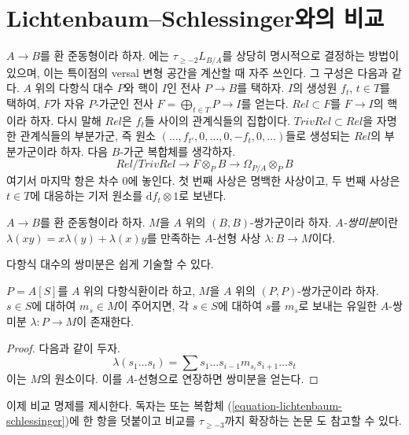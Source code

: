 \section{Lichtenbaum--Schlessinger와의 비교}
\label{section-compare-higher}

\noindent
$A \to B$를 환 준동형이라 하자. \cite{Lichtenbaum-Schlessinger}에는
$\tau_{\geq -2}L_{B/A}$를 상당히 명시적으로 결정하는 방법이 있으며,
이는 특이점의 versal 변형 공간을 계산할 때 자주 쓰인다. 그 구성은 다음과
같다. $A$ 위의 다항식 대수 $P$와 핵이 $I$인 전사 $P \to B$를 택하자.
$I$의 생성원 $f_t$, $t \in T$를 택하여, $F$가 자유 $P$-가군인 전사
$F = \bigoplus_{t \in T} P \to I$를 얻는다. $Rel \subset F$를
$F \to I$의 핵이라 하자. 다시 말해 $Rel$은 $f_t$들 사이의 관계식들의
집합이다. $TrivRel \subset Rel$을 자명한 관계식들의 부분가군, 즉 원소
$(\ldots, f_{t'}, 0, \ldots, 0, -f_t, 0, \ldots)$들로 생성되는 $Rel$의
부분가군이라 하자. 다음 $B$-가군 복합체를 생각하자.
\begin{equation}
\label{equation-lichtenbaum-schlessinger}
Rel/TrivRel \longrightarrow
F \otimes_P B \longrightarrow
\Omega_{P/A} \otimes_P B
\end{equation}
여기서 마지막 항은 차수 $0$에 놓인다. 첫 번째 사상은 명백한 사상이고,
두 번째 사상은 $t \in T$에 대응하는 기저 원소를
$\text{d}f_t \otimes 1$로 보낸다.

\begin{definition}
\label{definition-biderivation}
$A \to B$를 환 준동형이라 하자. $M$을 $A$ 위의 $(B, B)$-쌍가군이라
하자. {\it $A$-쌍미분}이란
$\lambda(xy) = x\lambda(y) + \lambda(x)y$를 만족하는 $A$-선형 사상
$\lambda : B \to M$이다.
\end{definition}

\noindent
다항식 대수의 쌍미분은 쉽게 기술할 수 있다.

\begin{lemma}
\label{lemma-polynomial-ring-unique}
$P = A[S]$를 $A$ 위의 다항식환이라 하고, $M$을 $A$ 위의
$(P, P)$-쌍가군이라 하자. $s \in S$에 대하여 $m_s \in M$이 주어지면,
각 $s \in S$에 대하여 $s$를 $m_s$로 보내는 유일한 $A$-쌍미분
$\lambda : P \to M$이 존재한다.
\end{lemma}

\begin{proof}
다음과 같이 두자.
$$
\lambda(s_1 \ldots s_t) =
\sum s_1 \ldots s_{i - 1} m_{s_i} s_{i + 1} \ldots s_t
$$
이는 $M$의 원소이다. 이를 $A$-선형으로 연장하면 쌍미분을 얻는다.
\end{proof}

\noindent
이제 비교 명제를 제시한다. 독자는 \cite[206쪽, 명제
12]{Andre-Homologie} 또는 복합체
(\ref{equation-lichtenbaum-schlessinger})에 한 항을 덧붙이고 비교를
$\tau_{\geq -3}$까지 확장하는 논문 \cite{Doncel}도 참고할 수 있다.

